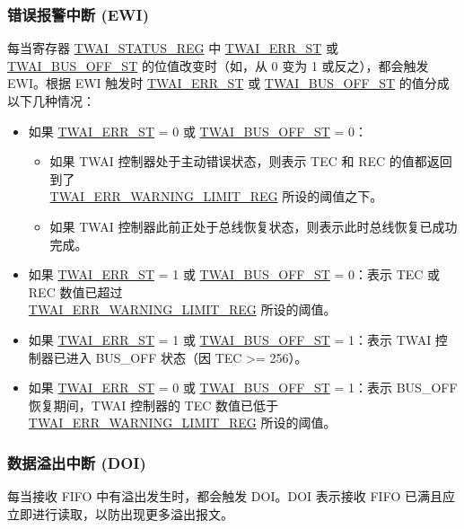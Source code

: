\documentclass[main\_\_CN.tex]{subfiles}
\begin{document}
\subsubsection{错误报警中断 (EWI)}
每当寄存器 \hyperref[regdesc:TWAISTATUSREG]{TWAI\_STATUS\_REG} 中 \hyperref[fielddesc:TWAIERRST]{TWAI\_ERR\_ST} 或 \hyperref[fielddesc:TWAIBUSOFFST]{TWAI\_BUS\_OFF\_ST} 的位值改变时（如，从 0 变为 1 或反之），都会触发 EWI。根据 EWI 触发时 \hyperref[fielddesc:TWAIERRST]{TWAI\_ERR\_ST} 或 \hyperref[fielddesc:TWAIBUSOFFST]{TWAI\_BUS\_OFF\_ST} 的值分成以下几种情况：

\begin{itemize}
    \item 如果 \hyperref[fielddesc:TWAIERRST]{TWAI\_ERR\_ST} = 0 或 \hyperref[fielddesc:TWAIBUSOFFST]{TWAI\_BUS\_OFF\_ST} = 0：
    \begin{itemize}
        \item 如果 TWAI 控制器处于主动错误状态，则表示 TEC 和 REC 的值都返回到了 \\\hyperref[regdesc:TWAIERRWARNINGLIMITREG]{TWAI\_ERR\_WARNING\_LIMIT\_REG} 所设的阈值之下。
        \item 如果 TWAI 控制器此前正处于总线恢复状态，则表示此时总线恢复已成功完成。
    \end{itemize}
    \item 如果 \hyperref[fielddesc:TWAIERRST]{TWAI\_ERR\_ST} = 1 或 \hyperref[fielddesc:TWAIBUSOFFST]{TWAI\_BUS\_OFF\_ST} = 0：表示 TEC 或 REC 数值已超过 \\\hyperref[regdesc:TWAIERRWARNINGLIMITREG]{TWAI\_ERR\_WARNING\_LIMIT\_REG} 所设的阈值。
    \item 如果 \hyperref[fielddesc:TWAIERRST]{TWAI\_ERR\_ST} = 1 或 \hyperref[fielddesc:TWAIBUSOFFST]{TWAI\_BUS\_OFF\_ST} = 1：表示 TWAI 控制器已进入 BUS\_OFF 状态（因 TEC >= 256）。
    \item 如果 \hyperref[fielddesc:TWAIERRST]{TWAI\_ERR\_ST} = 0 或 \hyperref[fielddesc:TWAIBUSOFFST]{TWAI\_BUS\_OFF\_ST} = 1：表示 BUS\_OFF 恢复期间，TWAI 控制器的 TEC 数值已低于 \hyperref[regdesc:TWAIERRWARNINGLIMITREG]{TWAI\_ERR\_WARNING\_LIMIT\_REG} 所设的阈值。
\end{itemize}

\subsubsection{数据溢出中断 (DOI)}
每当接收 FIFO 中有溢出发生时，都会触发 DOI。DOI 表示接收 FIFO 已满且应立即进行读取，以防出现更多溢出报文。
\end{document}

